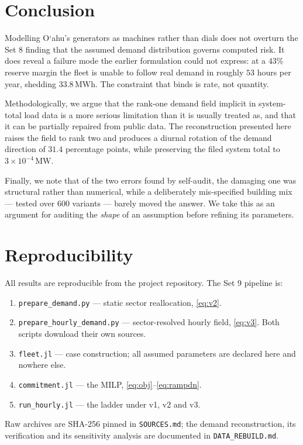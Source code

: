 \documentclass[11pt,a4paper]{article}
\theoremstyle{definition}
\theoremstyle{plain}
\theoremstyle{remark}
\newcommand{\MW}{\,\mathrm{MW}}
\newcommand{\MWh}{\,\mathrm{MWh}}
\newcommand{\okina}{\textquoteleft}
\newcommand{\Oahu}{O\okina ahu}
\begin{document}
\section{Conclusion}

Modelling \Oahu{}'s generators as machines rather than dials does not overturn
the Set 8 finding that the assumed demand distribution governs computed risk. It
does reveal a failure mode the earlier formulation could not express: at a $43\%$
reserve margin the fleet is unable to follow real demand in roughly $53$ hours
per year, shedding $33.8\MWh$. The constraint that binds is rate, not quantity.

Methodologically, we argue that the rank-one demand field implicit in
system-total load data is a more serious limitation than it is usually treated
as, and that it can be partially repaired from public data. The reconstruction
presented here raises the field to rank two and produces a diurnal rotation of
the demand direction of $31.4$ percentage points, while preserving the filed
system total to $3\times10^{-4}\MW$.

Finally, we note that of the two errors found by self-audit, the damaging one
was structural rather than numerical, while a deliberately mis-specified
building mix --- tested over $600$ variants --- barely moved the answer. We take
this as an argument for auditing the \emph{shape} of an assumption before
refining its parameters.

\appendix

\section{Reproducibility}
\label{app:repro}

All results are reproducible from the project repository. The Set 9 pipeline is:
\begin{enumerate}[leftmargin=1.4em,itemsep=1pt]
\item \texttt{prepare\_demand.py} --- static sector reallocation, \eqref{eq:v2}.
\item \texttt{prepare\_hourly\_demand.py} --- sector-resolved hourly field,
  \eqref{eq:v3}. Both scripts download their own sources.
\item \texttt{fleet.jl} --- case construction; all assumed parameters are
  declared here and nowhere else.
\item \texttt{commitment.jl} --- the MILP, \eqref{eq:obj}--\eqref{eq:rampdn}.
\item \texttt{run\_hourly.jl} --- the ladder under v1, v2 and v3.
\end{enumerate}
Raw archives are SHA-256 pinned in \texttt{SOURCES.md}; the demand
reconstruction, its verification and its sensitivity analysis are documented in
\texttt{DATA\_REBUILD.md}.
\end{document}
